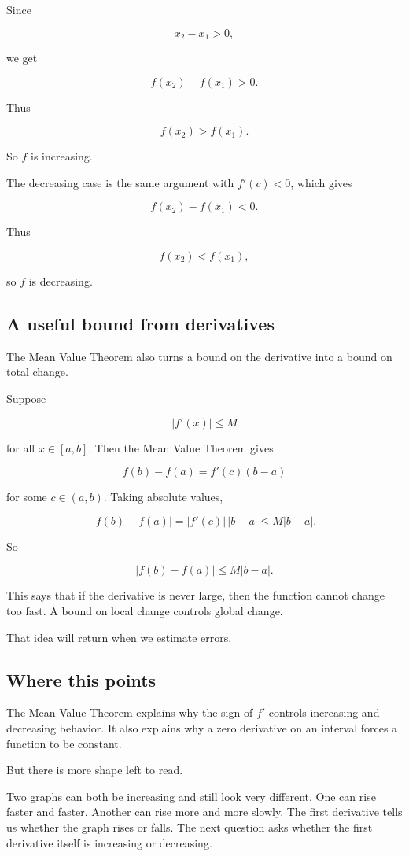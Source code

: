 Since

\[
x_2-x_1>0,
\]

we get

\[
f(x_2)-f(x_1)>0.
\]

Thus

\[
f(x_2)>f(x_1).
\]

So \(f\) is increasing.

The decreasing case is the same argument with \(f'(c)<0\), which gives

\[
f(x_2)-f(x_1)<0.
\]

Thus

\[
f(x_2)<f(x_1),
\]

so \(f\) is decreasing.

\subsection{A useful bound from derivatives}
\label{subsec:mvt-derivative-bound}

The Mean Value Theorem also turns a bound on the derivative into a bound on total
change.

Suppose

\[
|f'(x)|\le M
\]

for all \(x\in[a,b]\).  Then the Mean Value Theorem gives

\[
f(b)-f(a)=f'(c)(b-a)
\]

for some \(c\in(a,b)\).  Taking absolute values,

\[
|f(b)-f(a)|
=
|f'(c)|\,|b-a|
\le
M|b-a|.
\]

So

\[
\boxed{
|f(b)-f(a)|\le M|b-a|.
}
\]

This says that if the derivative is never large, then the function cannot change too
fast.  A bound on local change controls global change.

That idea will return when we estimate errors.

\subsection{Where this points}
\label{subsec:mvt-hook-concavity}

The Mean Value Theorem explains why the sign of \(f'\) controls increasing and
decreasing behavior.  It also explains why a zero derivative on an interval forces a
function to be constant.

But there is more shape left to read.

Two graphs can both be increasing and still look very different.  One can rise faster
and faster.  Another can rise more and more slowly.  The first derivative tells us
whether the graph rises or falls.  The next question asks whether the first derivative
itself is increasing or decreasing.


